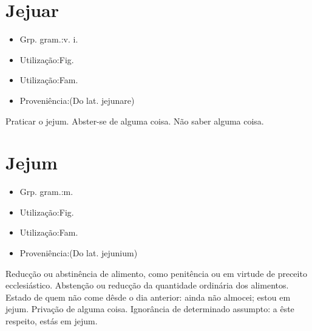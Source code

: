 \documentclass{article}
\begin{document}
\section{Jejuar}
\begin{itemize}
\item {Grp. gram.:v. i.}
\end{itemize}
\begin{itemize}
\item {Utilização:Fig.}
\end{itemize}
\begin{itemize}
\item {Utilização:Fam.}
\end{itemize}
\begin{itemize}
\item {Proveniência:(Do lat. \textunderscore jejunare\textunderscore )}
\end{itemize}
Praticar o jejum.
Abster-se de alguma coisa.
Não saber alguma coisa.
\section{Jejum}
\begin{itemize}
\item {Grp. gram.:m.}
\end{itemize}
\begin{itemize}
\item {Utilização:Fig.}
\end{itemize}
\begin{itemize}
\item {Utilização:Fam.}
\end{itemize}
\begin{itemize}
\item {Proveniência:(Do lat. \textunderscore jejunium\textunderscore )}
\end{itemize}
Reducção ou abstinência de alimento, como penitência ou em virtude de preceito ecclesiástico.
Abstenção ou reducção da quantidade ordinária dos alimentos.
Estado de quem não come dêsde o dia anterior: \textunderscore ainda não almocei; estou em jejum\textunderscore .
Privação de alguma coisa.
Ignorância de determinado assumpto: \textunderscore a êste respeito, estás em jejum\textunderscore .
\end{document}
